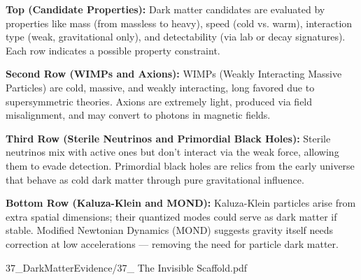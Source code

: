 \begin{SideNotePage}{
  \textbf{Top (Candidate Properties):}  
  Dark matter candidates are evaluated by properties like mass (from massless to heavy), speed (cold vs. warm), interaction type (weak, gravitational only), and detectability (via lab or decay signatures). Each row indicates a possible property constraint. \par

  \textbf{Second Row (WIMPs and Axions):}  
  WIMPs (Weakly Interacting Massive Particles) are cold, massive, and weakly interacting, long favored due to supersymmetric theories. Axions are extremely light, produced via field misalignment, and may convert to photons in magnetic fields. \par

  \textbf{Third Row (Sterile Neutrinos and Primordial Black Holes):}  
  Sterile neutrinos mix with active ones but don’t interact via the weak force, allowing them to evade detection. Primordial black holes are relics from the early universe that behave as cold dark matter through pure gravitational influence. \par

  \textbf{Bottom Row (Kaluza-Klein and MOND):}  
  Kaluza-Klein particles arise from extra spatial dimensions; their quantized modes could serve as dark matter if stable. Modified Newtonian Dynamics (MOND) suggests gravity itself needs correction at low accelerations — removing the need for particle dark matter. \par

}{37_DarkMatterEvidence/37_ The Invisible Scaffold.pdf}
\end{SideNotePage}
